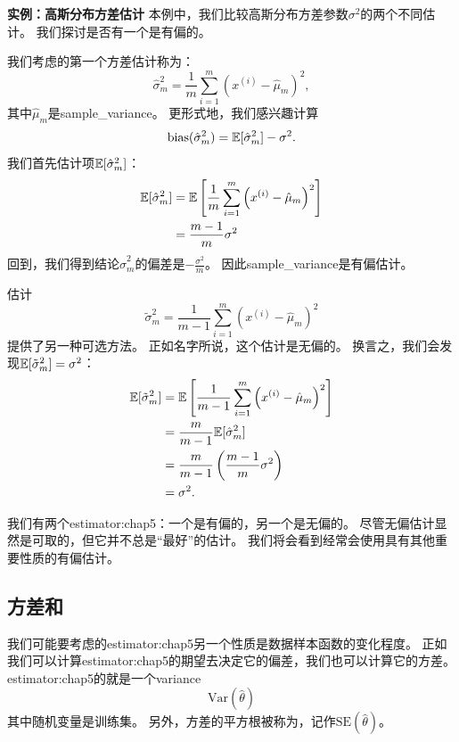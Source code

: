 
\textbf{实例：高斯分布方差估计}\quad 
本例中，我们比较高斯分布方差参数$\sigma^2$的两个不同估计。
我们探讨是否有一个是有偏的。

我们考虑的第一个方差估计称为：
\begin{equation}
    \hat{\sigma}_m^2 = \frac{1}{m} \sum_{i=1}^m \left( x^{(i)} - \hat{\mu}_m \right)^2,
\end{equation}
其中$\hat{\mu}_m$是\gls{sample_variance}。
更形式地，我们感兴趣计算
\begin{equation}
\label{eq:5.37}
    \text{bias} (\hat{\sigma}_m^2) = \mathbb{E} [ \hat{\sigma}_m^2 ]  - \sigma^2.
\end{equation}
我们首先估计项$\mathbb{E} [ \hat{\sigma}_m^2 ]$：
\begin{align}
    \mathbb{E} [ \hat{\sigma}_m^2 ]  &= \mathbb{E} \left[ \frac{1}{m} \sum_{i=1}^m \left( x^{(i)} - \hat{\mu}_m \right)^2  \right] \\
    &= \frac{m-1}{m} \sigma^2
\end{align}
回到，我们得到结论$\hat{\sigma}^2_m$的偏差是$-\frac{\sigma^2}{m}$。
因此\gls{sample_variance}是有偏估计。

估计
\begin{equation}
    \tilde{\sigma}_m^2 = \frac{1}{m-1} \sum_{i=1}^m \left( x^{(i)} - \hat{\mu}_m \right)^2
\end{equation}
提供了另一种可选方法。
正如名字所说，这个估计是无偏的。
换言之，我们会发现$\mathbb{E}[\tilde{\sigma}_m^2] = \sigma^2$：
\begin{align}
    \mathbb{E}[\tilde{\sigma}_m^2] &= \mathbb{E} \left[ \frac{1}{m-1} \sum_{i=1}^m \left( x^{(i)} - \hat{\mu}_m \right)^2 \right] \\
        &= \frac{m}{m-1} \mathbb{E}[ \hat{\sigma}_m^2 ]  \\
        &= \frac{m}{m-1} \left( \frac{m-1}{m} \sigma^2 \right) \\
        &= \sigma^2.
\end{align}


我们有两个\gls{estimator:chap5}：一个是有偏的，另一个是无偏的。
尽管无偏估计显然是可取的，但它并不总是“最好”的估计。
我们将会看到经常会使用具有其他重要性质的有偏估计。

\subsection{方差和}
\label{sec:variance_and_standard_error}
我们可能要考虑的\gls{estimator:chap5}另一个性质是数据样本函数的变化程度。
正如我们可以计算\gls{estimator:chap5}的期望去决定它的偏差，我们也可以计算它的方差。
\gls{estimator:chap5}的就是一个\gls{variance}
\begin{equation}
    \text{Var}(\hat{\theta})
\end{equation}
其中随机变量是训练集。
另外，方差的平方根被称为，记作$\text{SE}(\hat{\theta})$。

